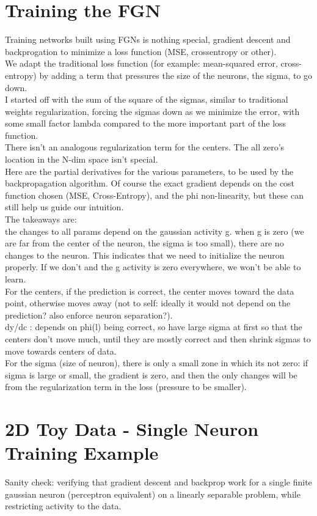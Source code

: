 \documentclass{article}
\begin{document}
\section{Training the FGN}
Training networks built using FGNs is nothing special, gradient descent and backprogation to minimize a loss function (MSE, crossentropy or other).\\
We adapt the traditional loss function (for example: mean-squared error, cross-entropy) by adding a term that pressures the size of the neurons, the sigma, to go down. \\
I started off with the sum of the square of the sigmas, similar to traditional weights regularization, forcing the sigmas down as we minimize the error, with some small factor lambda compared to the more important part of the loss function.\\
There isn't an analogous regularization term for the centers. The all zero's location in the N-dim space isn't special. \\
Here are the partial derivatives for the various parameters, to be used by the backpropagation algorithm. Of course the exact gradient depends on the cost function chosen (MSE, Cross-Entropy), and the phi non-linearity, but these can still help us guide our intuition.\\
The takeaways are:\\
the changes to all params depend on the gaussian activity g. when g is zero (we are far from the center of the neuron, the sigma is too small), there are no changes to the neuron. This indicates that we need to initialize the neuron properly. If we don't and the g activity is zero everywhere, we won't be able to learn.\\
For the centers, if the prediction is correct, the center moves toward the data point, otherwise moves away (not to self: ideally it would not depend on the prediction? also enforce neuron separation?). \\
dy/dc : depends on phi(l) being correct, so have large sigma at first so that the centers don't move much, until they are mostly correct and then shrink sigmas to move towards centers of data.\\
For the sigma (size of neuron), there is only a small zone in which its not zero: if sigma is large or small, the gradient is zero, and then the only changes will be from the regularization term in the loss (pressure to be smaller).\\

\section{2D Toy Data - Single Neuron Training Example}
Sanity check: verifying that gradient descent and backprop work for a single finite gaussian neuron (perceptron equivalent) on a linearly separable problem, while restricting activity to the data.\\
\end{document}
